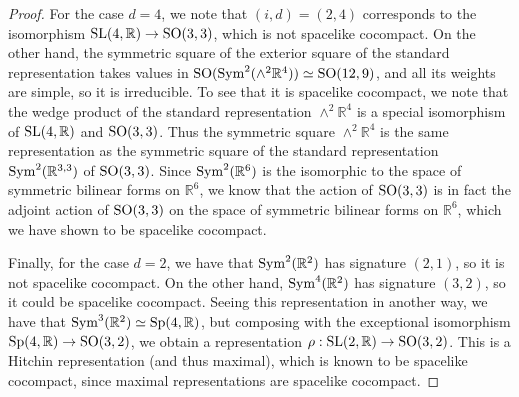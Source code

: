\documentclass{report}
\begin{document}
\begin{itemize}
\begin{proof}
For the case $d=4$, we note that $(i,d) = (2,4)$ corresponds to the isomorphism $\operatorname{{\mathrm{SL}}}(4,\mathbb R) \to \operatorname{{\mathrm{SO}}}(3,3)$, which is not spacelike cocompact.
On the other hand, the symmetric square of the exterior square of the standard representation takes values in  $\operatorname{{\mathrm{SO}}}(\operatorname{Sym}^2(\wedge^2\mathbb R^4)) \simeq \operatorname{{\mathrm{SO}}}(12,9)$, and all its weights are simple, so it is irreducible.
To see that it is spacelike cocompact, we note that the wedge product of the standard representation $\wedge^2 \mathbb R^4$ is a special isomorphism of $\operatorname{{\mathrm{SL}}}(4,\mathbb R)$ and $\operatorname{{\mathrm{SO}}}(3,3)$.
Thus the symmetric square $\wedge^2 \mathbb R^4$ is the same representation as the symmetric square of the standard representation $\operatorname{Sym}^2(\mathbb R^{3,3})$ of $\operatorname{{\mathrm{SO}}}(3,3)$. 
Since $\operatorname{Sym}^2(\mathbb R^6)$ is the isomorphic to the space of symmetric bilinear forms on $\mathbb R^6$, we know that the action of $\operatorname{{\mathrm{SO}}}(3,3)$ is in fact the adjoint action of $\operatorname{{\mathrm{SO}}}(3,3)$ on the space of symmetric bilinear forms on $\mathbb R^6$, which we have shown to be spacelike cocompact.

Finally, for the case $d = 2$, we have that $\operatorname{Sym}^2(\mathbb R^2)$ has signature $(2,1)$, so it is not spacelike cocompact.
On the other hand, $\operatorname{Sym}^4(\mathbb R^2)$ has signature $(3,2)$, so it could be spacelike cocompact.
Seeing this representation in another way, we have that $\operatorname{Sym}^3(\mathbb R^2) \simeq \operatorname{{\mathrm{Sp}}}(4, \mathbb R)$, but composing with the exceptional isomorphism $\operatorname{{\mathrm{Sp}}}(4, \mathbb R) \to \operatorname{{\mathrm{SO}}}(3,2)$, we obtain a representation $\rho: \operatorname{{\mathrm{SL}}}(2,\mathbb R) \to \operatorname{{\mathrm{SO}}}(3,2)$.
This is a Hitchin representation (and thus maximal), which is known to be spacelike cocompact, since maximal representations are spacelike cocompact.
\end{proof}
\end{itemize}    
\end{document}

